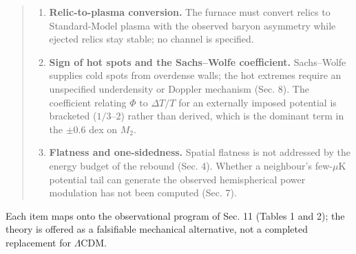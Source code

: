 \documentclass[
]{article}
\begin{document}
\begin{quote}
\begin{enumerate}
  assumed (the horizon problem stands), and since the jammed patch is
  super-horizon its total extent is unconstrained. Ejection proceeds
  where Newtonian escape velocity vastly exceeds \(c\); the \(N\)-body
  mechanism lacks a relativistic formulation, prerequisite for H1
  (Bounce) to be a physical theory rather than an analogy. Which of the
  two geometries of Sec. 3 applies is itself undetermined by the theory
  and is left to H5 (Our Position). The neighbour of H3 (Neighbour)/H6
  (Neighbour Location) lies beyond the particle horizon, so its imprint
  must be an initial-condition potential (Sec. 7); how such a potential
  is laid down across a domain boundary is not modelled.
\item
  \textbf{Relic-to-plasma conversion.} The furnace must convert relics
  to Standard-Model plasma with the observed baryon asymmetry while
  ejected relics stay stable; no channel is specified.
\item
  \textbf{Sign of hot spots and the Sachs--Wolfe coefficient.}
  Sachs--Wolfe supplies cold spots from overdense walls; the hot
  extremes require an unspecified underdensity or Doppler mechanism
  (Sec. 8). The coefficient relating \(\Phi\) to \(\Delta T/T\) for an
  externally imposed potential is bracketed (\(1/3\)--\(2\)) rather than
  derived, which is the dominant term in the \(\pm 0.6\) dex on \(M_2\).
\item
  \textbf{Flatness and one-sidedness.} Spatial flatness is not addressed
  by the energy budget of the rebound (Sec. 4). Whether a neighbour's
  few-\(\mu\)K potential tail can generate the observed hemispherical
  power modulation has not been computed (Sec. 7).
\end{enumerate}
\end{quote}

Each item maps onto the observational program of Sec. 11 (Tables 1 and
2); the theory is offered as a falsifiable mechanical alternative, not a
completed replacement for \(\Lambda\)CDM.
\end{document}
